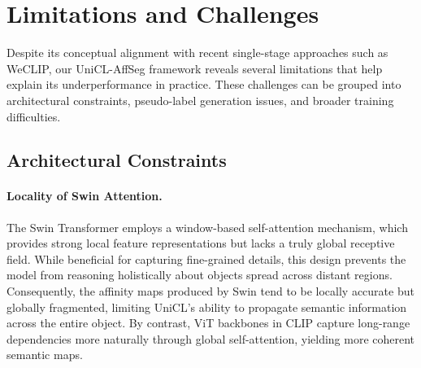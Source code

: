 





\section{Limitations and Challenges}
\label{sec:limitations_and_challenges}

Despite its conceptual alignment with recent single-stage approaches such as WeCLIP, our UniCL-AffSeg framework reveals several limitations that help explain its underperformance in practice. These challenges can be grouped into architectural constraints, pseudo-label generation issues, and broader training difficulties.

\subsection{Architectural Constraints}

\paragraph{Locality of Swin Attention.}
The Swin Transformer employs a window-based self-attention mechanism, which provides strong local feature representations but lacks a truly global receptive field. While beneficial for capturing fine-grained details, this design prevents the model from reasoning holistically about objects spread across distant regions. Consequently, the affinity maps produced by Swin tend to be locally accurate but globally fragmented, limiting UniCL’s ability to propagate semantic information across the entire object. By contrast, ViT backbones in CLIP capture long-range dependencies more naturally through global self-attention, yielding more coherent semantic maps.

